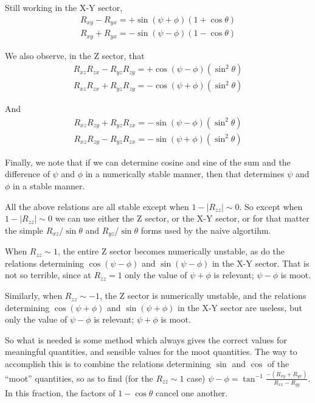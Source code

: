 Still working in the X-Y sector, 
\begin{eqnarray}
R_{xy} - R_{yx} = + \sin ( \psi + \phi ) (1 + \cos \theta) \\
R_{xy} + R_{yx} = - \sin ( \psi - \phi ) (1 - \cos \theta) 
\end{eqnarray}

We also observe, in the Z sector, that
\begin{eqnarray}
R_{xz} R_{zx} - R_{yz} R_{zy} = + \cos ( \psi - \phi ) (\sin^2 \theta) \\
R_{xz} R_{zx} + R_{yz} R_{zy} = - \cos ( \psi + \phi ) (\sin^2 \theta)
\end{eqnarray}

And 
\begin{eqnarray}
R_{xz} R_{zy} + R_{yz} R_{zx} = - \sin ( \psi - \phi ) (\sin^2 \theta) \\
R_{xz} R_{zy} - R_{yz} R_{zx} = - \sin ( \psi + \phi ) (\sin^2 \theta)
\end{eqnarray}

Finally, we note that if we can determine cosine and sine of the sum and the 
difference of $\psi$ and $\phi$ in a numerically stable manner, then that
determines $\psi$ and $\phi$ in a stable manner. 

All the above relations are all stable except when $1- |R_{zz}| \sim 0$.
So except when $1- |R_{zz}| \sim 0$ we can use either the Z sector, 
or the X-Y sector, or for
that matter the simple $R_{xz}/\sin \theta$ and $R_{yz}/\sin \theta$ forms
used by the naive algortihm.

When $R_{zz} \sim 1$, the entire Z sector becomes numerically unstable, 
as do the relations determining $\cos ( \psi - \phi )$ and 
$\sin ( \psi - \phi )$ in the X-Y sector.  
That is not so terrible, since at $R_{zz} = 1$ only the value of 
$\psi + \phi$ is relevant; $\psi - \phi$ is moot.

Similarly, when $R_{zz} \sim -1$, the  Z sector is numerically unstable, 
and the relations determining $\cos ( \psi + \phi )$ and 
$\sin ( \psi + \phi )$ in the X-Y sector are useless, but only the value of 
$\psi - \phi$ is relevant; $\psi + \phi$ is moot.
 
So what is needed is some method which always gives the correct values
for meaningful quantities, and sensible values for the
moot quantities.
The way to accomplish this is to combine the relations determining $\sin$ and
$\cos$ of the ``moot'' quantities, so as to find (for the $R_{zz} \sim 1$ case)
$\psi - \phi = \tan^{-1} \frac{ -(R_{xy} + R_{yx}) }{ R_{xx} - R_{yy} }$. 
In this fraction, the factors of $1 - \cos \theta$ cancel one another. 

